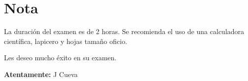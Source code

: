 \documentclass{article}
\begin{document}
\section*{Nota}

La duración del examen es de 2 horas. Se recomienda el uso de una calculadora científica, lapicero y hojas tamaño oficio.

Les deseo mucho éxito en su examen.

\textbf{Atentamente:} J Cueva
\end{document}
